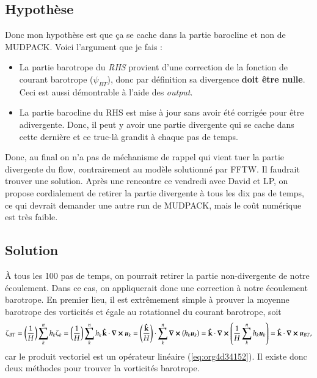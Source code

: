 \documentclass[10pt]{article}
\numberwithin{equation}{section}
\newcommand{\kvf}{\vb{\hat{k}}}
\newcommand{\uu}{\vb*{u}}
\newcommand{\pt}{\hspace{1pt}}
\begin{document}
\subsection{Hypothèse}
\label{sec:orgf912124}
Donc mon hypothèse est que ça se cache dans la partie barocline et non de MUDPACK.
Voici l'argument que je fais :
\begin{itemize}
\item La partie barotrope du \emph{RHS} provient d'une correction de la fonction de courant barotrope (\(\psi_{BT}\)), donc par définition sa divergence \textbf{doit être nulle}. Ceci est aussi démontrable à l'aide des \emph{output}.
\item La partie barocline du RHS est mise à jour sans avoir été corrigée pour être adivergente.
Donc, il peut y avoir une partie divergente qui se cache dans cette dernière et ce truc-là grandit à chaque pas de temps.
\end{itemize}

Donc, au final on n'a pas de méchanisme de rappel qui vient tuer la partie divergente du flow, contrairement au modèle solutionné par FFTW.
Il faudrait trouver une solution.
Après une rencontre ce vendredi avec David et LP, on propose cordialement de retirer la partie divergente à tous les dix pas de temps, ce qui devrait demander une autre run de MUDPACK, mais le coût numérique est très faible.

\subsection{Solution}
\label{sec:orgfbbce5d}

À tous les 100 pas de temps, on pourrait retirer la partie non-divergente de notre écoulement.
Dans ce cas, on appliquerait donc une correction à notre écoulement barotrope.
En premier lieu, il est extrêmement simple à prouver la moyenne barotrope des vorticités et égale au rotationnel du courant barotrope, soit
\begin{equation}
\label{eq:org4d34152}
   \zeta_{BT} = \qty(\frac{1}{H})\sum_k^n h_k\zeta_k = \qty(\frac{1}{H})\sum_k^n h_k\pt \kvf \cdot \curl{\uu_k} = \qty(\frac{ \kvf}{H})\cdot\sum_k^n\curl(h_k\uu_k) = \kvf\cdot\curl(\frac{1}{H}\sum_k^n h_k\uu_k) = \kvf\cdot\curl{\uu_{BT}},
\end{equation}
car le produit vectoriel est un opérateur linéaire (\ref{eq:org4d34152}).
Il existe donc deux méthodes pour trouver la vorticités barotrope.\bigskip
\end{document}
